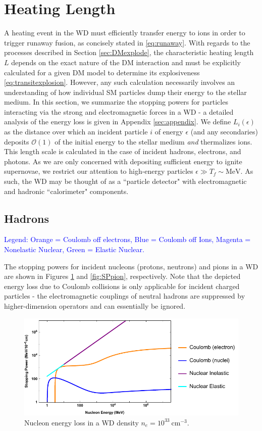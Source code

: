 \documentclass[twocolumn,showpacs,preprintnumbers,amsmath,amssymb,prd]{revtex4}
\newcommand{\OO}{\mathcal{O}}
\begin{document}
\section{Heating Length}
\label{sec:HeatingLength}
A heating event in the WD must efficiently transfer energy to ions in order to trigger runaway fusion, as concisely stated in \eqref{eq:runaway}. With regards to the processes described in Section \ref{sec:DMexplode}, the characteristic heating length $L$ depends on the exact nature of the DM interaction and must be explicitly calculated for a given DM model to determine its explosiveness \eqref{eq:transitexplosion}. However, any such calculation necessarily involves an understanding of how individual SM particles dump their energy to the stellar medium. In this section, we summarize the stopping powers for particles interacting via the strong and electromagnetic forces in a WD - a detailed analysis of the energy loss is given in Appendix \ref{sec:appendix}. We define $L_i(\epsilon)$ as the distance over which an incident particle $i$ of energy $\epsilon$ (and any secondaries) deposits $\OO(1)$ of the initial energy to the stellar medium \emph{and} thermalizes ions. This length scale is calculated in the case of incident hadrons, electrons, and photons. As we are only concerned with depositing sufficient energy to ignite supernovae, we restrict our attention to high-energy particles $\epsilon \gg T_f \sim \text{MeV}$. As such, the WD may be thought of as a ``particle detector" with electromagnetic and hadronic ``calorimeter" components.

\subsection{Hadrons}
\textcolor{blue}{Legend: Orange = Coulomb off electrons, Blue = Coulomb off Ions, Magenta = Nonelastic Nuclear, Green = Elastic Nuclear.}

The stopping powers for incident nucleons (protons, neutrons) and pions in a WD are shown in Figures \ref{fig:SPnuc} and \ref{fig:SPpion}, respectively. Note that the depicted energy loss due to Coulomb collisions is only applicable for incident charged particles - the electromagnetic couplings of neutral hadrons are suppressed by higher-dimension operators and can essentially be ignored.
\begin{figure}
\label{fig:SPnuc}
\includegraphics[scale=.45]{SPnucleon.pdf}
\caption{Nucleon energy loss in a WD density $n_e = 10^{33} ~\text{cm}^{-3}$.}
\end{figure}
\end{document}
